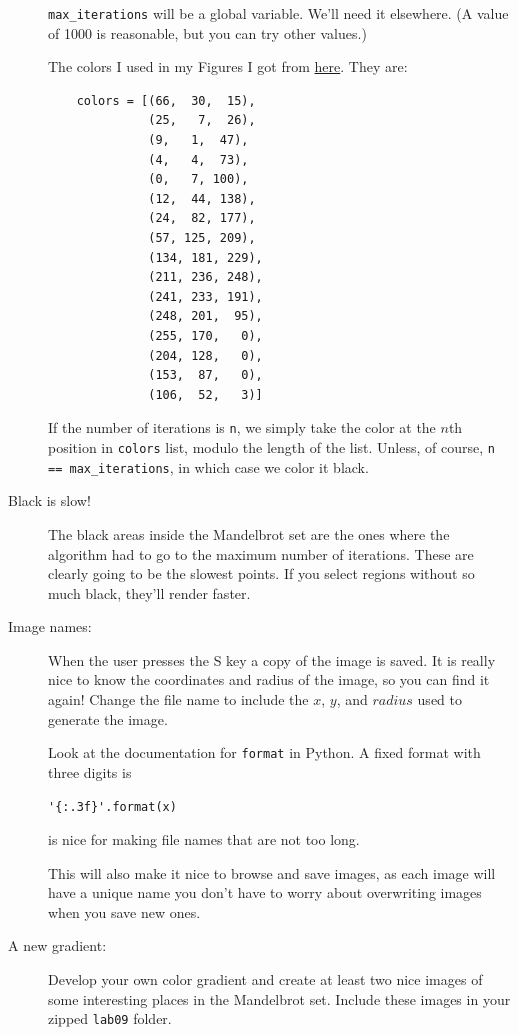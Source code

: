 \documentclass[12pt]{article}
\begin{document}
\begin{description}
\lstinline{max_iterations} will be a global
variable.  We'll need it elsewhere.  (A value of
1000 is reasonable, but you can try other values.)

The colors I used in my Figures I got from 
\href{https://stackoverflow.com/questions/16500656/which-color-gradient-is-used-to-color-mandelbrot-in-wikipedia}{here}.
They are:
\begin{lstlisting}
    colors = [(66,  30,  15),
              (25,   7,  26),
              (9,   1,  47),
              (4,   4,  73),
              (0,   7, 100),
              (12,  44, 138),
              (24,  82, 177),
              (57, 125, 209),
              (134, 181, 229),
              (211, 236, 248),
              (241, 233, 191),
              (248, 201,  95),
              (255, 170,   0),
              (204, 128,   0),
              (153,  87,   0),
              (106,  52,   3)]
\end{lstlisting}
If the number of iterations is \lstinline{n},
we simply take the color at the $n$th
position in \lstinline{colors} list, modulo the length of
the list.
Unless, of course, \lstinline{n == max_iterations},
in which case we color it black.

\item[Black is slow!]  The black areas inside
the Mandelbrot set are the ones where the algorithm
had to go to the maximum number of iterations.
These are clearly going to be the slowest points.
If you select regions without so much black,
they'll render faster.

\item[Image names:] When the user presses the S
key a copy of the image is saved.  It is really nice
to know the coordinates and radius of the image,
so you can find it again!  Change the file name
to include the $x$, $y$, and $radius$ used to generate
the image.  

Look at the documentation for \lstinline{format}
in Python.  A fixed format with three digits is
\begin{lstlisting}
'{:.3f}'.format(x)
\end{lstlisting}
is nice for making file names that are not too long.

This will also make it nice to browse and save images,
as each image will have a unique name you don't have
to worry about overwriting images when you save new ones.

\item[A new gradient:] Develop your own
color gradient and create at least two nice images
of some interesting places in the Mandelbrot set.
Include these images in your zipped \lstinline{lab09}
folder.

\end{description}
\newpage
\end{document}

